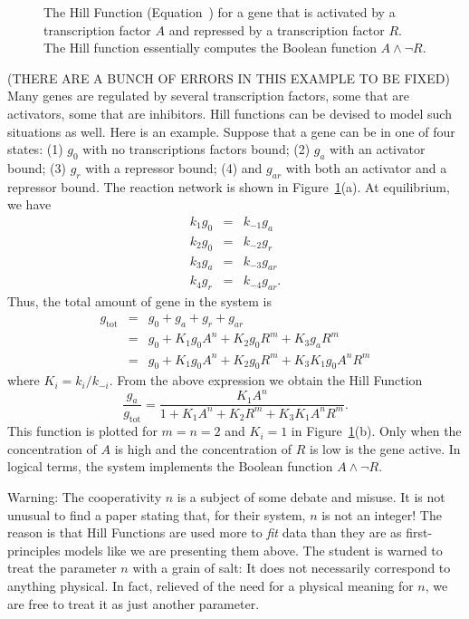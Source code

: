 \begin{figure}
\caption{\label{fig:act-rep} The Hill Function
  (Equation~) for a gene that is activated by a
  transcription factor $A$ and repressed by a transcription factor
  $R$.  The Hill function essentially computes the Boolean function $A
  \wedge \neg R$.  }
\end{figure}

\begin{example} (THERE ARE A BUNCH OF ERRORS IN THIS EXAMPLE TO BE
  FIXED) Many genes are regulated by several transcription factors,
  some that are activators, some that are inhibitors. Hill functions
  can be devised to model such situations as well. Here is an
  example. Suppose that a gene can be in one of four states: (1) $g_0$
  with no transcriptions factors bound; (2) $g_a$ with an activator
  bound; (3) $g_r$ with a repressor bound; (4) and $g_{ar}$ with both
  an activator and a repressor bound. The reaction network is shown in
  Figure~\ref{fig:act-rep}(a). At equilibrium, we have
%
\begin{eqnarray*}
k_1 g_0 & = & k_{-1} g_a \\
k_2 g_0 & = & k_{-2} g_r \\
k_3 g_a & = & k_{-3} g_{ar} \\
k_4 g_r & = & k_{-4} g_{ar} .
\end{eqnarray*}
Thus, the total amount of gene in the system is
%
\begin{eqnarray*}
g_\mathrm{tot} & = & g_0 + g_a + g_r + g_{ar} \\
 & = & g_0 + K_1 g_0 A^n + K_2 g_0 R^m + K_3 g_a R^m \\
 & = & g_0 + K_1 g_0 A^n + K_2 g_0 R^m + K_3  K_1 g_0 A^n R^m 
\end{eqnarray*}
where $K_i = k_i / k_{-i}$. From the above expression we obtain the Hill Function 
%
\begin{equation}\label{eq:alt-rep}
\frac{g_a}{g_\mathrm{tot}} = \frac{K_1 A^n}{1 + K_1A^n + K_2R^m + K_3  K_1A^n R^m}.
\end{equation}
%
This function is plotted for $m=n=2$ and $K_i=1$ in
Figure~\ref{fig:act-rep}(b). Only when the concentration of $A$ is
high and the concentration of $R$ is low is the gene active. In
logical terms, the system implements the Boolean function $A \wedge \neg R$. 
%
\enx
\end{example}

Warning: The cooperativity $n$ is a subject of some debate and
misuse. It is not unusual to find a paper stating that, for their
system, $n$ is not an integer! The reason is that Hill Functions are
used more to {\em fit} data than they are as first-principles models
like we are presenting them above. The student is warned to treat the
parameter $n$ with a grain of salt: It does not necessarily correspond
to anything physical. In fact, relieved of the need for a physical
meaning for $n$, we are free to treat it as just another parameter.




